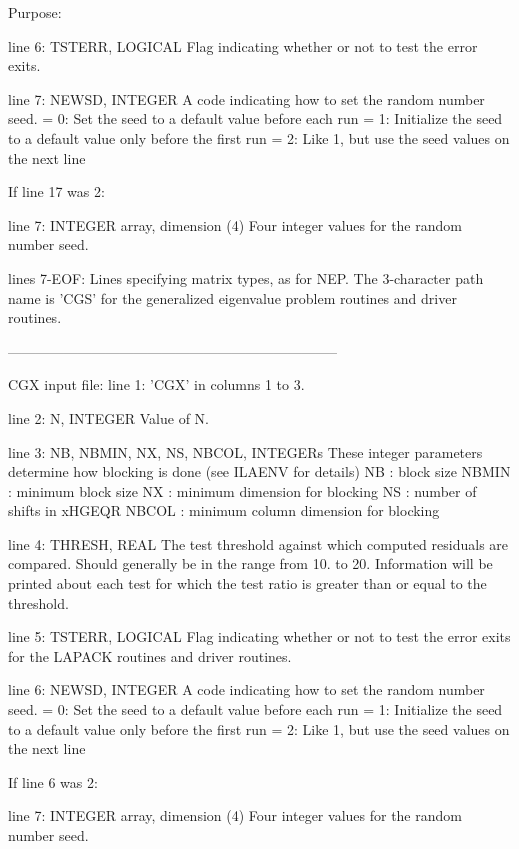 \begin{DoxyParagraph}{Purpose\+: }
\begin{DoxyVerb}
 line 6:  TSTERR, LOGICAL
          Flag indicating whether or not to test the error exits.

 line 7:  NEWSD, INTEGER
          A code indicating how to set the random number seed.
          = 0:  Set the seed to a default value before each run
          = 1:  Initialize the seed to a default value only before the
                first run
          = 2:  Like 1, but use the seed values on the next line

 If line 17 was 2:

 line 7:  INTEGER array, dimension (4)
          Four integer values for the random number seed.

 lines 7-EOF:  Lines specifying matrix types, as for NEP.
          The 3-character path name is 'CGS' for the generalized
          eigenvalue problem routines and driver routines.

-----------------------------------------------------------------------

 CGX input file:
 line 1:  'CGX' in columns 1 to 3.

 line 2:  N, INTEGER
          Value of N.

 line 3:  NB, NBMIN, NX, NS, NBCOL, INTEGERs
          These integer parameters determine how blocking is done
          (see ILAENV for details)
          NB     : block size
          NBMIN  : minimum block size
          NX     : minimum dimension for blocking
          NS     : number of shifts in xHGEQR
          NBCOL  : minimum column dimension for blocking

 line 4:  THRESH, REAL
          The test threshold against which computed residuals are
          compared. Should generally be in the range from 10. to 20.
          Information will be printed about each test for which the
          test ratio is greater than or equal to the threshold.

 line 5:  TSTERR, LOGICAL
          Flag indicating whether or not to test the error exits for
          the LAPACK routines and driver routines.

 line 6:  NEWSD, INTEGER
          A code indicating how to set the random number seed.
          = 0:  Set the seed to a default value before each run
          = 1:  Initialize the seed to a default value only before the
                first run
          = 2:  Like 1, but use the seed values on the next line

 If line 6 was 2:

 line 7: INTEGER array, dimension (4)
          Four integer values for the random number seed.


\end{DoxyVerb}
\end{DoxyParagraph}
